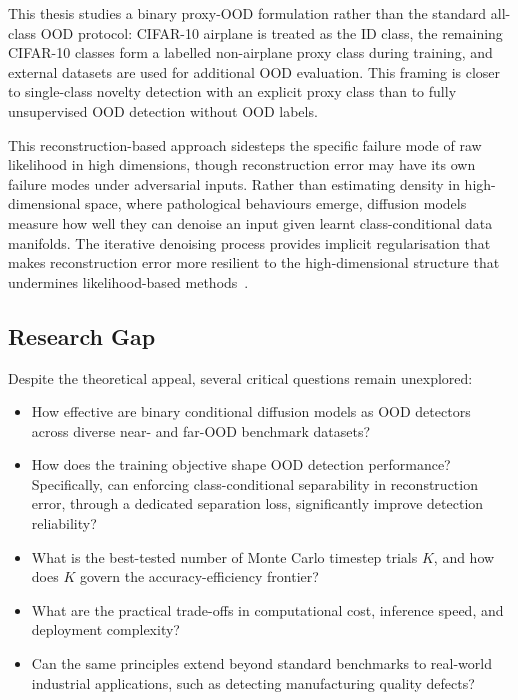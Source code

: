 This thesis studies a binary proxy-OOD formulation rather than the standard all-class OOD protocol: CIFAR-10 airplane is treated as the ID class, the remaining CIFAR-10 classes form a labelled non-airplane proxy class during training, and external datasets are used for additional OOD evaluation. This framing is closer to single-class novelty detection with an explicit proxy class than to fully unsupervised OOD detection without OOD labels.

This reconstruction-based approach sidesteps the specific failure mode of raw likelihood in high dimensions, though reconstruction error may have its own failure modes under adversarial inputs. Rather than estimating density in high-dimensional space, where pathological behaviours emerge, diffusion models measure how well they can denoise an input given learnt class-conditional data manifolds. The iterative denoising process provides implicit regularisation that makes reconstruction error more resilient to the high-dimensional structure that undermines likelihood-based methods~\cite{wyatt2022anoddpm, graham2023denoising}.

\subsection{Research Gap}
\label{sec:intro:gap}

Despite the theoretical appeal, several critical questions remain unexplored:

\begin{itemize}
    \item How effective are binary conditional diffusion models as OOD detectors across diverse near- and far-OOD benchmark datasets?
    \item How does the training objective shape OOD detection performance? Specifically, can enforcing class-conditional separability in reconstruction error, through a dedicated separation loss, significantly improve detection reliability?
    \item What is the best-tested number of Monte Carlo timestep trials $K$, and how does $K$ govern the accuracy-efficiency frontier?
    \item What are the practical trade-offs in computational cost, inference speed, and deployment complexity?
    \item Can the same principles extend beyond standard benchmarks to real-world industrial applications, such as detecting manufacturing quality defects?
\end{itemize}

